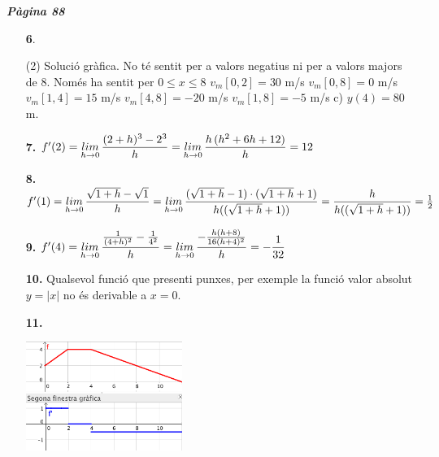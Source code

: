 \documentclass[a4paper, pdf, twoside]{book}
\begin{document}

{\textbf{\em Pàgina 88}} \hrulefill
\begin{enumerate}
\vspace{0.25cm}



 \item[\fontfamily{phv}\selectfont\color{blue}\textbf{6}. ] 
 \begin{tasks}[column-sep=1em, item-indent=1.3333em](2)
	 \task* Solució gràfica. No té sentit per a valors negatius ni per a valors majors de 8. Només ha sentit per $0 \leq x \leq 8$
	 \task $v_m [0,2] = 30$ m/s
	 \task $v_m[0,8] = 0$ m/s
	 \task $v_m [1,4] = 15$ m/s
	 \task $v_m [4,8] = - 20$ m/s
	 \task $v_m [1,8] = - 5$ m/s
	 \task c) $y(4) = 80$ m.
\end{tasks}
 \end{enumerate}
\begin{enumerate}
\vspace{0.25cm}
\item[\fontfamily{phv}\selectfont\color{blue}\textbf{7. }] 
$f'(2)=\limx [h]{0} \dfrac {(2+h)^3 - 2^3}{h}=\limx [h]{0} \dfrac {h\,(h^2+6h+12)}{h}=12$
\vspace{0.25cm}
\item[\fontfamily{phv}\selectfont\color{blue}\textbf{8. }] 
$f'(1)=\limx [h]{0} \dfrac {\sqrt {1+h}-\sqrt {1}}{h}=\limx [h]{0} \dfrac {(\sqrt {1+h}-1)\cdot (\sqrt {1+h}+1)}{h ((\sqrt {1+h}+1))}= \dfrac {h}{h ((\sqrt {1+h}+1))}=\frac {1}{2}$
\vspace{0.25cm}
\item[\fontfamily{phv}\selectfont\color{blue}\textbf{9. }] 
$f'(4)=\limx [h]{0} \dfrac {\frac {1}{(4+h)^2}-\frac {1}{4^2}}{h}=\limx [h]{0} \dfrac {-\frac {h(h+8)}{16(h+4)^2}}{h}=-\dfrac {1}{32}$
\vspace{0.25cm}
\item[\fontfamily{phv}\selectfont\color{blue}\textbf{10. }] 
Qualsevol funció que presenti punxes, per exemple la funció valor absolut $y=|x|$ no és derivable a $x=0$.
\vspace{0.25cm}
\item[\fontfamily{phv}\selectfont\color{blue}\textbf{11. }] 
\mbox {}\par \includegraphics [width=0.4\textwidth ]{img-sol/t7-11}
 \end{enumerate}
\vspace{0.3cm}
\end{document}
